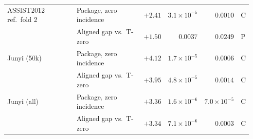 \begin{table}[H]
\begin{tabular}{@{}llrrrl@{}}
ASSIST2012 ref.\ fold 2 & Package, zero incidence & $+2.41$ & $3.1\times10^{-5}$ & $0.0010$ & C \\
 & Aligned gap vs.\ T-zero & $+1.50$ & $0.0037$ & $0.0249$ & P \\
\addlinespace
Junyi (50k) & Package, zero incidence & $+4.12$ & $1.7\times10^{-5}$ & $0.0006$ & C \\
 & Aligned gap vs.\ T-zero & $+3.95$ & $4.8\times10^{-5}$ & $0.0014$ & C \\
\addlinespace
Junyi (all) & Package, zero incidence & $+3.36$ & $1.6\times10^{-6}$ & $7.0\times10^{-5}$ & C \\
 & Aligned gap vs.\ T-zero & $+3.34$ & $7.1\times10^{-6}$ & $0.0003$ & C \\
\bottomrule
\end{tabular}
\end{table}
